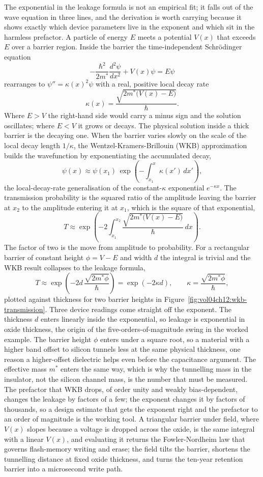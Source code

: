 The exponential in the leakage formula is not an empirical fit; it
falls out of the wave equation in three lines, and the derivation is
worth carrying because it shows exactly which device parameters live
in the exponent and which sit in the harmless prefactor. A particle of
energy $E$ meets a potential $V(x)$ that exceeds $E$ over a barrier
region. Inside the barrier the time-independent Schr\"odinger equation
\[
-\frac{\hbar^{2}}{2m^{*}}\frac{d^{2}\psi}{dx^{2}} + V(x)\psi = E\psi
\]
rearranges to $\psi'' = \kappa(x)^{2}\psi$ with a real, positive local
decay rate
\[
\kappa(x) = \frac{\sqrt{2m^{*}\big(V(x) - E\big)}}{\hbar}.
\]
Where $E > V$ the right-hand side would carry a minus sign and the
solution oscillates; where $E < V$ it grows or decays. The physical
solution inside a thick barrier is the decaying one. When the barrier
varies slowly on the scale of the local decay length $1/\kappa$, the
Wentzel-Kramers-Brillouin (WKB) approximation builds the wavefunction
by exponentiating the accumulated decay,
\[
\psi(x) \approx \psi(x_1)\,
\exp\!\left(-\int_{x_1}^{x}\kappa(x')\,dx'\right),
\]
the local-decay-rate generalisation of the constant-$\kappa$ exponential
$e^{-\kappa x}$. The transmission probability is the squared ratio of the
amplitude leaving the barrier at $x_2$ to the amplitude entering it at
$x_1$, which is the square of that exponential,
\[
T \approx \exp\!\left(-2\int_{x_1}^{x_2}
\frac{\sqrt{2m^{*}\big(V(x) - E\big)}}{\hbar}\,dx\right).
\]
The factor of two is the move from amplitude to probability. For a
rectangular barrier of constant height $\phi = V - E$ and width $d$ the
integral is trivial and the WKB result collapses to the leakage formula,
\[
T \approx \exp\!\left(-2d\,
\frac{\sqrt{2m^{*}\phi}}{\hbar}\right)
= \exp(-2\kappa d),
\qquad
\kappa = \frac{\sqrt{2m^{*}\phi}}{\hbar},
\]
plotted against thickness for two barrier heights in
Figure~\ref{fig:vol04ch12:wkb-transmission}. Three device readings come
straight off the exponent. The thickness $d$ enters linearly inside the
exponential, so leakage is exponential in oxide thickness, the origin of
the five-orders-of-magnitude swing in the worked example. The barrier
height $\phi$ enters under a square root, so a material with a higher
band offset to silicon tunnels less at the same physical thickness, one
reason a higher-offset dielectric helps even before the capacitance
argument. The effective mass $m^{*}$ enters the same way, which is why
the tunnelling mass in the insulator, not the silicon channel mass, is
the number that must be measured. The prefactor that WKB drops, of order
unity and weakly bias-dependent, changes the leakage by factors of a few;
the exponent changes it by factors of thousands, so a design estimate
that gets the exponent right and the prefactor to an order of magnitude
is the working tool. A triangular barrier under field, where $V(x)$
slopes because a voltage is dropped across the oxide, is the same integral
with a linear $V(x)$, and evaluating it returns the Fowler-Nordheim law
that governs flash-memory writing and erase; the field tilts the barrier,
shortens the tunnelling distance at fixed oxide thickness, and turns the
ten-year retention barrier into a microsecond write path.

